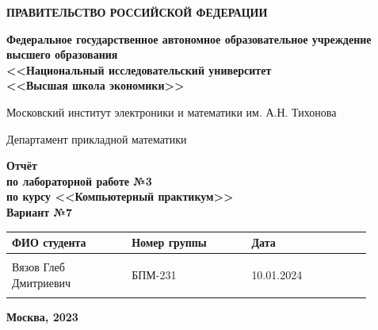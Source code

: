 \documentclass[12pt]{article}
\begin{document}
\thispagestyle{empty}
\begin{center}
\textbf{ПРАВИТЕЛЬСТВО РОССИЙСКОЙ ФЕДЕРАЦИИ}

\vspace{5ex}
	
\textbf{Федеральное государственное автономное образовательное учреждение \\ высшего образования \\ <<Национальный исследовательский университет \\ <<Высшая школа экономики>>}
\end{center}
\vspace{5ex}

\begin{center}
    Московский институт электроники и математики им. А.Н. Тихонова  
    
    \vspace{5ex}
    
    Департамент прикладной математики
    
    \vspace{10ex}
    \textbf{Отчёт \\ по лабораторной работе №3 \\ по курсу <<Компьютерный практикум>> \\ Вариант №7}
	\vspace{7ex}

\end{center}

\begin{center} 
\begin{tabular}{| p{0.3\linewidth}| p{0.3\linewidth}| p{0.3\linewidth}|}
 \hline	
ФИО студента & Номер группы & Дата \\  \hline
 & & \\  
Вязов Глеб \newline Дмитриевич & БПМ-231 & 10.01.2024\\  
 & & \\  \hline		
\end{tabular}
\end{center}

\begin{center}
	\vspace{3ex}
	
	\vfill
   
   \normalsize
    
	\textbf{Москва, 2023}
\end{center}

\newpage
\end{document}
